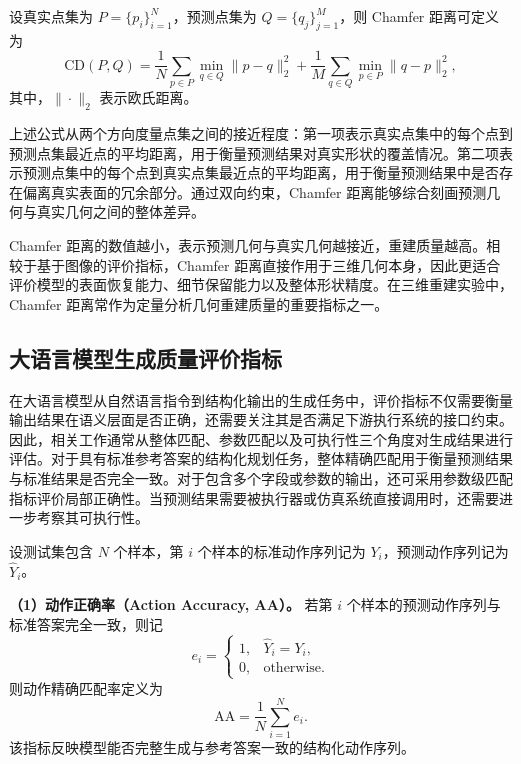 设真实点集为 $P=\{p_i\}_{i=1}^{N}$，预测点集为 $Q=\{q_j\}_{j=1}^{M}$，则 Chamfer 距离可定义为
\begin{equation}
\mathrm{CD}(P,Q) =
\frac{1}{N}\sum_{p \in P}\min_{q \in Q}\|p-q\|_2^2
+
\frac{1}{M}\sum_{q \in Q}\min_{p \in P}\|q-p\|_2^2 ,
\label{eq:cd}
\end{equation}
其中，$\|\cdot\|_2$ 表示欧氏距离。

上述公式从两个方向度量点集之间的接近程度：第一项表示真实点集中的每个点到预测点集最近点的平均距离，用于衡量预测结果对真实形状的覆盖情况。第二项表示预测点集中的每个点到真实点集最近点的平均距离，用于衡量预测结果中是否存在偏离真实表面的冗余部分。通过双向约束，Chamfer 距离能够综合刻画预测几何与真实几何之间的整体差异。

Chamfer 距离的数值越小，表示预测几何与真实几何越接近，重建质量越高。相较于基于图像的评价指标，Chamfer 距离直接作用于三维几何本身，因此更适合评价模型的表面恢复能力、细节保留能力以及整体形状精度。在三维重建实验中，Chamfer 距离常作为定量分析几何重建质量的重要指标之一。

\subsection{大语言模型生成质量评价指标}

在大语言模型从自然语言指令到结构化输出的生成任务中，评价指标不仅需要衡量输出结果在语义层面是否正确，还需要关注其是否满足下游执行系统的接口约束。因此，相关工作\cite{wei2025plangenllms,yu2018spider,zhong2020semantic}通常从整体匹配、参数匹配以及可执行性三个角度对生成结果进行评估。对于具有标准参考答案的结构化规划任务，整体精确匹配用于衡量预测结果与标准结果是否完全一致。对于包含多个字段或参数的输出，还可采用参数级匹配指标评价局部正确性。当预测结果需要被执行器或仿真系统直接调用时，还需要进一步考察其可执行性。

设测试集包含 $N$ 个样本，第 $i$ 个样本的标准动作序列记为 $Y_i$，预测动作序列记为 $\hat{Y}_i$。

\textbf{（1）动作正确率（Action Accuracy, AA）。}
若第 $i$ 个样本的预测动作序列与标准答案完全一致，则记
\[
e_i =
\begin{cases}
1, & \hat{Y}_i = Y_i,\\
0, & \text{otherwise}.
\end{cases}
\]
则动作精确匹配率定义为
\begin{equation}
\mathrm{AA}=\frac{1}{N}\sum_{i=1}^{N} e_i .
\label{eq:action_accuracy}
\end{equation}
该指标反映模型能否完整生成与参考答案一致的结构化动作序列。

